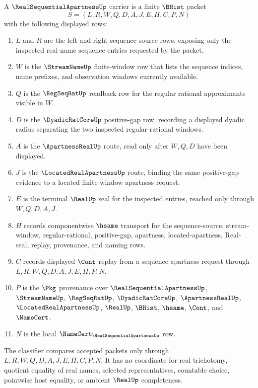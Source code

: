 \begin{definition}\label{def:real-sequential-apartness-carrier}
A $\RealSequentialApartnessUp$ carrier is a finite $\BHist$ packet
$$
S=(L,R,W,Q,D,A,J,E,H,C,P,N)
$$
with the following displayed rows:
\begin{enumerate}
\item $L$ and $R$ are the left and right sequence-source rows, exposing only the inspected real-name sequence entries requested by the packet.
\item $W$ is the $\StreamNameUp$ finite-window row that lists the sequence indices, name prefixes, and observation windows currently available.
\item $Q$ is the $\RegSeqRatUp$ readback row for the regular rational approximants visible in $W$.
\item $D$ is the $\DyadicRatCoreUp$ positive-gap row, recording a displayed dyadic radius separating the two inspected regular-rational windows.
\item $A$ is the $\ApartnessRealUp$ route, read only after $W,Q,D$ have been displayed.
\item $J$ is the $\LocatedRealApartnessUp$ route, binding the same positive-gap evidence to a located finite-window apartness request.
\item $E$ is the terminal $\RealUp$ seal for the inspected entries, reached only through $W,Q,D,A,J$.
\item $H$ records componentwise $\hsame$ transport for the sequence-source, stream-window, regular-rational, positive-gap, apartness, located-apartness, Real-seal, replay, provenance, and naming rows.
\item $C$ records displayed $\Cont$ replay from a sequence apartness request through $L,R,W,Q,D,A,J,E,H,P,N$.
\item $P$ is the $\Pkg$ provenance over $\RealSequentialApartnessUp$, $\StreamNameUp$, $\RegSeqRatUp$, $\DyadicRatCoreUp$, $\ApartnessRealUp$, $\LocatedRealApartnessUp$, $\RealUp$, $\BHist$, $\hsame$, $\Cont$, and $\NameCert$.
\item $N$ is the local $\NameCert_{\RealSequentialApartnessUp}$ row.
\end{enumerate}
The classifier compares accepted packets only through $L,R,W,Q,D,A,J,E,H,C,P,N$. It has no coordinate for real trichotomy, quotient equality of real names, selected representatives, countable choice, pointwise host equality, or ambient $\RealUp$ completeness.
\end{definition}

